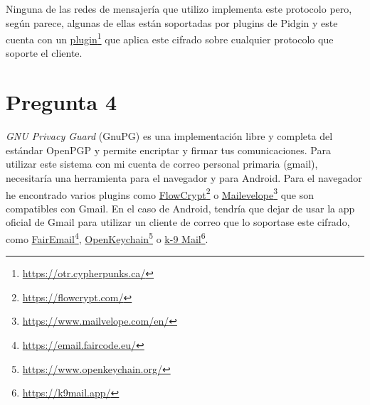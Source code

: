 Ninguna de las redes de mensajería que utilizo implementa este protocolo pero, según parece, algunas de ellas están soportadas por plugins de Pidgin y este cuenta con un \href{https://otr.cypherpunks.ca/}{plugin}\footnote{\url{https://otr.cypherpunks.ca/}} que aplica este cifrado sobre cualquier protocolo que soporte el cliente.

\section{Pregunta 4}
\emph{GNU Privacy Guard} (GnuPG) es una implementación libre y completa del estándar OpenPGP y permite encriptar y firmar tus comunicaciones. Para utilizar este sistema con mi cuenta de correo personal primaria (gmail), necesitaría una herramienta para el navegador y para Android. Para el navegador he encontrado varios plugins como \href{https://flowcrypt.com/}{FlowCrypt}\footnote{\url{https://flowcrypt.com/}} o \href{https://www.mailvelope.com/en/}{Mailevelope}\footnote{\url{https://www.mailvelope.com/en/}} que son compatibles con Gmail. En el caso de Android, tendría que dejar de usar la app oficial de Gmail para utilizar un cliente de correo que lo soportase este cifrado, como \href{https://email.faircode.eu/}{FairEmail}\footnote{\url{https://email.faircode.eu/}}, \href{https://www.openkeychain.org/}{OpenKeychain}\footnote{\url{https://www.openkeychain.org/}} o \href{https://k9mail.app/}{k-9 Mail}\footnote{\url{https://k9mail.app/}}.